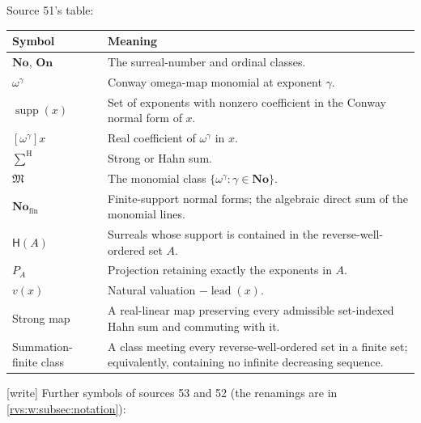 \documentclass[11pt,letterpaper]{article}
\numberwithin{equation}{section}
\theoremstyle{definition}
\theoremstyle{remark}
\newcommand{\No}{\mathbf{No}}
\newcommand{\On}{\mathbf{On}}
\newcommand{\M}{\mathfrak{M}}
\newcommand{\Hahn}{\mathsf{H}}
\newcommand{\Fin}{\No_{\mathrm{fin}}}
\newcommand{\supp}{\operatorname{supp}}
\newcommand{\lead}{\operatorname{lead}}
\newcommand{\sH}{\mathop{\sum}\nolimits^{\mathrm H}}
\newcommand{\wtag}{\textup{[write]}}%
\begin{document}
Source 51's table:

\begin{center}
\small
\begin{tabularx}{0.96\textwidth}{L{0.24\textwidth}Y}
\toprule
Symbol & Meaning\\
\midrule
\(\No\), \(\On\) & The surreal-number and ordinal classes.\\
\(\omega^\gamma\) & Conway omega-map monomial at exponent \(\gamma\).\\
\(\supp(x)\) & Set of exponents with nonzero coefficient in the Conway normal
form of \(x\).\\
\([\omega^\gamma]x\) & Real coefficient of \(\omega^\gamma\) in \(x\).\\
\(\sH\) & Strong or Hahn sum.\\
\(\M\) & The monomial class \(\{\omega^\gamma:\gamma\in\No\}\).\\
\(\Fin\) & Finite-support normal forms; the algebraic direct sum of the
monomial lines.\\
\(\Hahn(A)\) & Surreals whose support is contained in the reverse-well-ordered
set \(A\).\\
\(P_A\) & Projection retaining exactly the exponents in \(A\).\\
\(v(x)\) & Natural valuation \(-\lead(x)\).\\
Strong map & A real-linear map preserving every admissible set-indexed Hahn
sum and commuting with it.\\
Summation-finite class & A class meeting every reverse-well-ordered set in a
finite set; equivalently, containing no infinite decreasing sequence.\\
\bottomrule
\end{tabularx}
\end{center}

\noindent\wtag{} Further symbols of sources 53 and 52 (the renamings are in
\cref{rvs:w:subsec:notation}):
\end{document}

